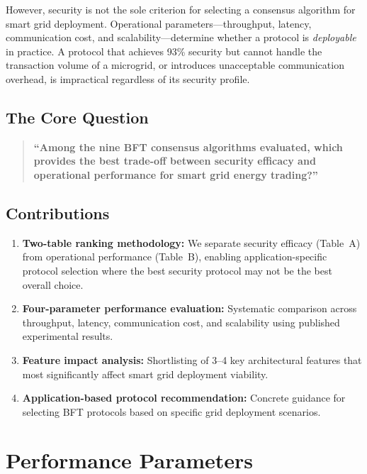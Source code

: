 \documentclass[10pt,twocolumn,letterpaper]{article}
\begin{document}
However, security is not the sole criterion for selecting a consensus algorithm for smart grid deployment. Operational parameters---throughput, latency, communication cost, and scalability---determine whether a protocol is \emph{deployable} in practice. A protocol that achieves 93\% security but cannot handle the transaction volume of a microgrid, or introduces unacceptable communication overhead, is impractical regardless of its security profile.

\subsection{The Core Question}

\begin{quote}
\textbf{``Among the nine BFT consensus algorithms evaluated, which provides the best trade-off between security efficacy and operational performance for smart grid energy trading?''}
\end{quote}

\subsection{Contributions}

\begin{enumerate}[leftmargin=*]
    \item \textbf{Two-table ranking methodology:} We separate security efficacy (Table~A) from operational performance (Table~B), enabling application-specific protocol selection where the best security protocol may not be the best overall choice.

    \item \textbf{Four-parameter performance evaluation:} Systematic comparison across throughput, latency, communication cost, and scalability using published experimental results.

    \item \textbf{Feature impact analysis:} Shortlisting of 3--4 key architectural features that most significantly affect smart grid deployment viability.

    \item \textbf{Application-based protocol recommendation:} Concrete guidance for selecting BFT protocols based on specific grid deployment scenarios.
\end{enumerate}

\section{Performance Parameters}
\label{sec:parameters}
\end{document}
